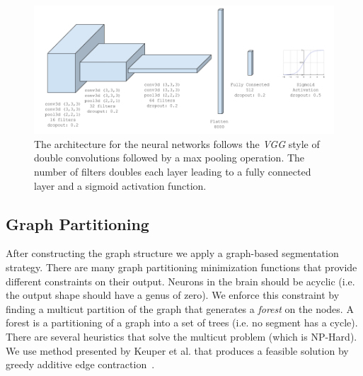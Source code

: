 \begin{figure}[t]
	\centering
	\includegraphics[width=0.95\linewidth]{figures/architecture.png}
	\caption{The architecture for the neural networks follows the \textit{VGG} style of double convolutions followed by a max pooling operation. The number of filters doubles each layer leading to a fully connected layer and a sigmoid activation function.}
	\label{fig:architecture}
\end{figure}

\subsection{Graph Partitioning}

After constructing the graph structure we apply a graph-based segmentation strategy.
There are many graph partitioning minimization functions that provide different constraints on their output.
Neurons in the brain should be acyclic (i.e. the output shape should have a genus of zero).
We enforce this constraint by finding a multicut partition of the graph that generates a \textit{forest} on the nodes.
A forest is a partitioning of a graph into a set of trees (i.e. no segment has a cycle).
There are several heuristics that solve the multicut problem (which is NP-Hard).
We use method presented by Keuper et al. that produces a feasible solution by greedy additive edge contraction~\cite{keuper2015efficient}.
